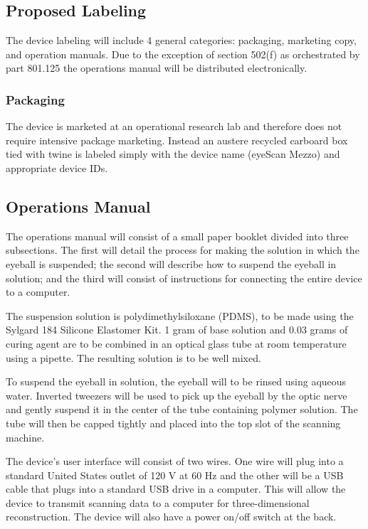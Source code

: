 \subsection{Proposed Labeling}

The device labeling will include 4 general categories: packaging,
marketing copy, and operation manuals. Due to the exception of section
502(f) as orchestrated by part 801.125 the operations manual will be
distributed electronically.

\subsubsection{Packaging}
The device is marketed at an operational research lab and therefore
does not require intensive package marketing. Instead an austere
recycled carboard box tied with twine is labeled simply with the
device name (eyeScan Mezzo) and appropriate device IDs.

\subsection{Operations Manual}
The operations manual will consist of a small paper booklet divided into three subsections. The first will detail the process for making the solution in which the eyeball is suspended; the second will describe how to suspend the eyeball in solution; and the third will consist of instructions for connecting the entire device to a computer. 

The suspension solution is polydimethylsiloxane (PDMS), to be made using the Sylgard 184 Silicone Elastomer Kit. 1 gram of base solution and 0.03 grams of curing agent are to be combined in an optical glass tube at room temperature using a pipette. The resulting solution is to be well mixed.

To suspend the eyeball in solution, the eyeball will to be rinsed using aqueous water. Inverted tweezers will be used to pick up the eyeball by the optic nerve and gently suspend it in the center of the tube containing polymer solution. The tube will then be capped tightly and placed into the top slot of the scanning machine. 

The device’s user interface will consist of two wires. One wire will plug into a standard United States outlet of 120 V at 60 Hz  and the other will be a USB cable that plugs into a standard USB drive in a computer. This will allow the device to transmit scanning data to a computer for  three-dimensional reconstruction. The device will also have a power on/off switch at the back. 

